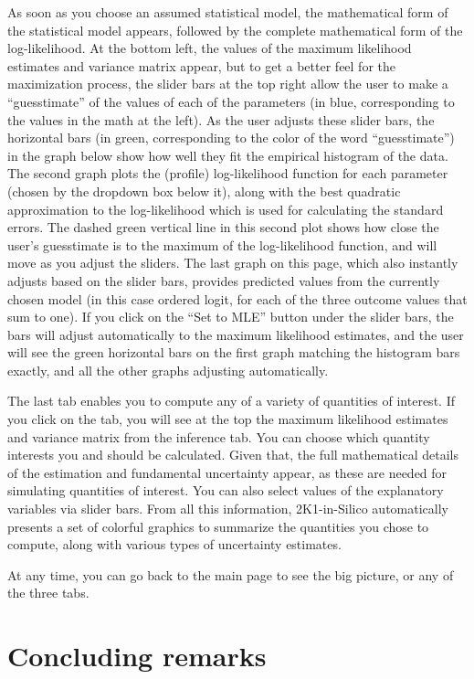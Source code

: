 \documentclass[12pt]{article}
\theoremstyle{definition}
\begin{document}
As soon as you choose an assumed statistical model, the mathematical form of the statistical model appears, followed by the complete mathematical form of the log-likelihood.  At the bottom left, the values of the maximum likelihood estimates and variance matrix appear, but to get a better feel for the maximization process, the slider bars at the top right allow the user to make a ``guesstimate'' of the values of each of the parameters (in blue, corresponding to the values in the math at the left). As the user adjusts these slider bars, the horizontal bars (in green, corresponding to the color of the word ``guesstimate'') in the graph below show how well they fit the empirical histogram of the data. The second graph plots the (profile) log-likelihood function for each parameter (chosen by the dropdown box below it), along with the best quadratic approximation to the log-likelihood which is used for calculating the standard errors.  The dashed green vertical line in this second plot shows how close the user's guesstimate is to the maximum of the log-likelihood function, and will move as you adjust the sliders.  The last graph on this page, which also instantly adjusts based on the slider bars, provides predicted values from the currently chosen model (in this case ordered logit, for each of the three outcome values that sum to one).  If you click on the ``Set to MLE'' button under the slider bars, the bars will adjust automatically to the maximum likelihood estimates, and the user will see the green horizontal bars on the first graph matching the histogram bars exactly, and all the other graphs adjusting automatically.

The last tab enables you to compute any of a variety of quantities of interest.  If you click on the tab, you will see at the top the maximum likelihood estimates and variance matrix from the inference tab. You can choose which quantity interests you and should be calculated.  Given that, the full mathematical details of the estimation and fundamental uncertainty appear, as these are needed for simulating quantities of interest. You can also select values of the explanatory variables via slider bars.  From all this information, 2K1-in-Silico automatically presents a set of colorful graphics to summarize the quantities you chose to compute, along with various types of uncertainty estimates.

At any time, you can go back to the main page to see the big picture, or any of the three tabs.

\section{Concluding remarks}
\end{document}
